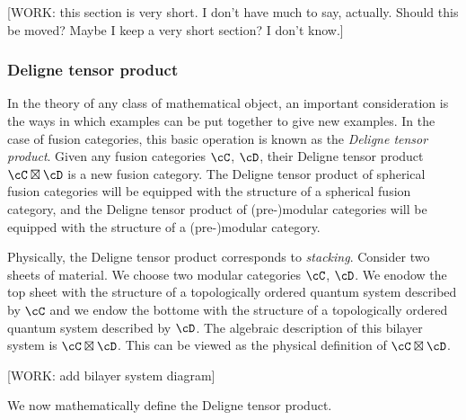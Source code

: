 [WORK: this section is very short. I don't have much to say, actually. Should this be moved? Maybe I keep a very short section? I don't know.]

\subsubsection{Deligne tensor product}

In the theory of any class of mathematical object, an important consideration is the ways in which examples can be put together to give new examples. In the case of fusion categories, this basic operation is known as the \textit{Deligne tensor product}. Given any fusion categories $\cC$, $\cD$, their Deligne tensor product $\cC\boxtimes \cD$ is a new fusion category. The Deligne tensor product of spherical fusion categories will be equipped with the structure of a spherical fusion category, and the Deligne tensor product of (pre-)modular categories will be equipped with the structure of a (pre-)modular category.

Physically, the Deligne tensor product corresponds to \textit{stacking}. Consider two sheets of material. We choose two modular categories $\cC$, $\cD$. We enodow the top sheet with the structure of a topologically ordered quantum system described by $\cC$ and we endow the bottome with the structure of a topologically ordered quantum system described by $\cD$. The algebraic description of this bilayer system is $\cC\boxtimes \cD$. This can be viewed as the physical definition of $\cC\boxtimes \cD$.

[WORK: add bilayer system diagram]

We now mathematically define the Deligne tensor product.

